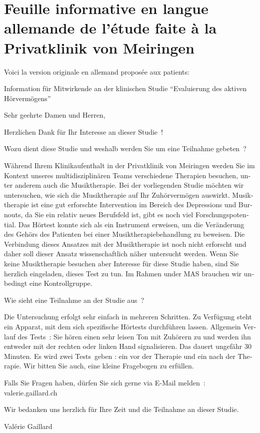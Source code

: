 \section{Feuille informative en langue allemande de l'étude faite à la Privatklinik von Meiringen}
Voici la version originale en allemand proposée aux patients:
\begin{german}

Information für Mitwirkende an der klinischen Studie
\foreignquote{german}{Evaluierung des aktiven Hörvermögens}


Sehr geehrte Damen und Herren,

Herzlichen Dank für Ihr Interesse an dieser Studie !

Wozu dient diese Studie und weshalb werden Sie um eine Teilnahme gebeten ?

Während Ihrem Klinikaufenthalt  in der Privatklinik von Meiringen werden Sie im Kontext 
unseres multidisziplinären Teams verschiedene Therapien besuchen, unter anderem auch die Musiktherapie. Bei der vorliegenden Studie möchten wir untersuchen, wie sich die Musiktherapie auf Ihr Zuhörvermögen auswirkt.
Musiktherapie ist eine gut erforschte Intervention im Bereich des Depressions und Burnouts, da Sie ein relativ neues Berufsfeld ist, gibt es noch viel Forschungspotential.
Das Hörtest konnte sich als ein Instrument erweisen, um die Veränderung des Gehörs des Patienten bei einer Musiktherapiebehandlung zu beweisen. Die Verbindung dieses Ansatzes mit der Musiktherapie ist noch nicht erforscht und daher soll dieser Ansatz wissenschaftlich näher untersucht werden.
Wenn Sie keine Musiktherapie besuchen aber Interesse für diese Studie haben, sind Sie herzlich eingeladen, dieses Test zu tun. Im Rahmen under MAS brauchen wir unbedingt eine Kontrollgruppe.

Wie sieht eine Teilnahme an der Studie aus ?

Die Untersuchung erfolgt sehr einfach in mehreren Schritten.
Zu Verfügung steht ein Apparat, mit dem sich spezifische Hörtests durchführen lassen.
Allgemein Verlauf des Tests :  
Sie hören einen sehr leisen Ton mit Zuhörern zu und werden ihn entweder mit der rechten  oder linken Hand  signalisieren. Das dauert ungefähr 30 Minuten.
Es wird zwei Tests geben : ein vor der Therapie und ein nach der Therapie.
Wir bitten Sie auch, eine kleine Fragebogen zu erfüllen.


Falls Sie Fragen haben, dürfen Sie sich gerne via E-Mail melden : valerie.gaillard\@gmx.ch

Wir bedanken uns herzlich für Ihre Zeit und die Teilnahme an dieser Studie.

\end{german}
Valérie Gaillard


